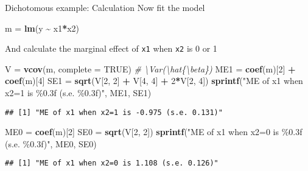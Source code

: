 \documentclass[
  ignorenonframetext,
]{beamer}
\newenvironment{Shaded}{\begin{snugshade}}{\end{snugshade}}
\newcommand{\AttributeTok}[1]{\textcolor[rgb]{0.13,0.29,0.53}{#1}}
\newcommand{\CommentTok}[1]{\textcolor[rgb]{0.56,0.35,0.01}{\textit{#1}}}
\newcommand{\ConstantTok}[1]{\textcolor[rgb]{0.56,0.35,0.01}{#1}}
\newcommand{\DecValTok}[1]{\textcolor[rgb]{0.00,0.00,0.81}{#1}}
\newcommand{\FunctionTok}[1]{\textcolor[rgb]{0.13,0.29,0.53}{\textbf{#1}}}
\newcommand{\NormalTok}[1]{#1}
\newcommand{\OtherTok}[1]{\textcolor[rgb]{0.56,0.35,0.01}{#1}}
\newcommand{\SpecialCharTok}[1]{\textcolor[rgb]{0.81,0.36,0.00}{\textbf{#1}}}
\newcommand{\StringTok}[1]{\textcolor[rgb]{0.31,0.60,0.02}{#1}}
\begin{document}
\begin{frame}[fragile]{Dichotomous example: Calculation}
\label{dichotomous-example-calculation}
Now fit the model

\begin{Shaded}
\begin{Highlighting}[]
\NormalTok{m }\OtherTok{=} \FunctionTok{lm}\NormalTok{(y }\SpecialCharTok{\textasciitilde{}}\NormalTok{ x1}\SpecialCharTok{*}\NormalTok{x2)}
\end{Highlighting}
\end{Shaded}

\pause

And calculate the marginal effect of \texttt{x1} when \texttt{x2} is 0 or 1

\begin{Shaded}
\begin{Highlighting}[]
\NormalTok{V }\OtherTok{=} \FunctionTok{vcov}\NormalTok{(m, }\AttributeTok{complete =} \ConstantTok{TRUE}\NormalTok{) }\CommentTok{\# \textbackslash{}Var(\textbackslash{}hat\{\textbackslash{}beta\})}
\NormalTok{ME1 }\OtherTok{=} \FunctionTok{coef}\NormalTok{(m)[}\DecValTok{2}\NormalTok{] }\SpecialCharTok{+} \FunctionTok{coef}\NormalTok{(m)[}\DecValTok{4}\NormalTok{]}
\NormalTok{SE1 }\OtherTok{=} \FunctionTok{sqrt}\NormalTok{(V[}\DecValTok{2}\NormalTok{, }\DecValTok{2}\NormalTok{] }\SpecialCharTok{+}\NormalTok{ V[}\DecValTok{4}\NormalTok{, }\DecValTok{4}\NormalTok{] }\SpecialCharTok{+} \DecValTok{2}\SpecialCharTok{*}\NormalTok{V[}\DecValTok{2}\NormalTok{, }\DecValTok{4}\NormalTok{])}
\FunctionTok{sprintf}\NormalTok{(}\StringTok{"ME of x1 when x2=1 is \%0.3f (s.e. \%0.3f)"}\NormalTok{, ME1, SE1)}
\end{Highlighting}
\end{Shaded}

\begin{verbatim}
## [1] "ME of x1 when x2=1 is -0.975 (s.e. 0.131)"
\end{verbatim}

\begin{Shaded}
\begin{Highlighting}[]
\NormalTok{ME0 }\OtherTok{=} \FunctionTok{coef}\NormalTok{(m)[}\DecValTok{2}\NormalTok{]}
\NormalTok{SE0 }\OtherTok{=} \FunctionTok{sqrt}\NormalTok{(V[}\DecValTok{2}\NormalTok{, }\DecValTok{2}\NormalTok{])}
\FunctionTok{sprintf}\NormalTok{(}\StringTok{"ME of x1 when x2=0 is \%0.3f (s.e. \%0.3f)"}\NormalTok{, ME0, SE0)}
\end{Highlighting}
\end{Shaded}

\begin{verbatim}
## [1] "ME of x1 when x2=0 is 1.108 (s.e. 0.126)"
\end{verbatim}
\end{frame}
\end{document}
